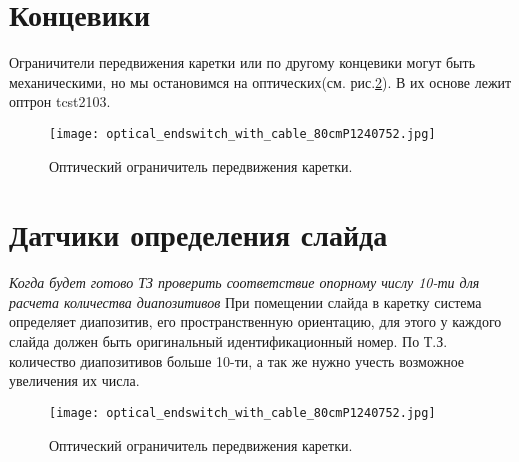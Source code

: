 \section{Концевики}
Ограничители передвижения каретки или по другому концевики могут быть механическими, но мы остановимся на оптических(см. рис.\ref{fig:optical_end}). В их основе лежит оптрон tcst2103.
\begin{figure}[ht]
	\centering
     \texttt{[image: optical\_endswitch\_with\_cable\_80cmP1240752.jpg]}
	\caption{Оптический ограничитель передвижения каретки.}
	\label{fig:optical_end}
\end{figure}

\section{Датчики определения слайда}
\textit{Когда будет готово ТЗ проверить соответствие опорному числу 10-ти для расчета количества диапозитивов}
При помещении слайда в каретку система определяет диапозитив, его пространственную ориентацию, для этого у каждого слайда должен быть оригинальный идентификационный номер. По Т.З. количество диапозитивов больше 10-ти, а так же нужно учесть возможное увеличения их числа.
\begin{figure}[ht]
	\centering
     \texttt{[image: optical\_endswitch\_with\_cable\_80cmP1240752.jpg]}
	\caption{Оптический ограничитель передвижения каретки.}
	\label{fig:optical_end}
\end{figure}